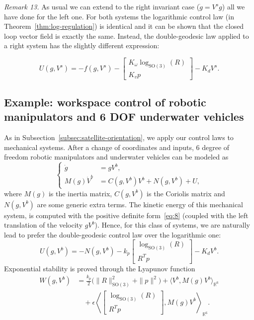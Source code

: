 \documentclass[10pt,twocolumn]{article}
\newcommand{\SO}{\mathrm{SO}}
\newcommand{\R}{\mathbb R}
\newcounter{paperitem}
\newcommand{\paperhead}[3]{\refstepcounter{paperitem}\par\medskip\noindent\textit{#1}\label{#3} #2\par}
\begin{document}
\paperhead{Remark 13.}{As usual we can extend to the right invariant case ($\dot g=V^s g$) all we have done for the left one. For both systems the logarithmic control law (in Theorem~\ref{thm:log-regulation}) is identical and it can be shown that the closed loop vector field is exactly the same. Instead, the double-geodesic law applied to a right system has the slightly different expression:}{rem:right-invariant}
\begin{equation*}
U(g,V^s)=-f(g,V^s)-
\begin{bmatrix}
K_\omega\log_{\SO(3)}(R)\\
K_vp
\end{bmatrix}-K_dV^s.
\end{equation*}

\subsection{Example: workspace control of robotic manipulators and 6 DOF underwater vehicles}\label{subsec:workspace-control}
As in Subsection~\ref{subsec:satellite-orientation}, we apply our control laws to mechanical systems. After a change of coordinates and inputs, 6 degree of freedom robotic manipulators and underwater vehicles can be modeled as
\begin{equation*}
\left\{\begin{aligned}
\dot g&=gV^b,\\
M(g)\dot V^b&=C(g,V^b)V^b+N(g,V^b)+U,
\end{aligned}\right.
\end{equation*}
where $M(g)$ is the inertia matrix, $C(g,V^b)$ is the Coriolis matrix and $N(g,V^b)$ are some generic extra terms. The kinetic energy of this mechanical system, is computed with the positive definite form~\eqref{eq:8} (coupled with the left translation of the velocity $gV^b$). Hence, for this class of systems, we are naturally lead to prefer the double-geodesic control law over the logarithmic one:
\begin{equation*}
U(g,V^b)=-N(g,V^b)-k_p
\begin{bmatrix}
\log_{\SO(3)}(R)\\
R^Tp
\end{bmatrix}-K_dV^b.
\end{equation*}
Exponential stability is proved through the Lyapunov function
\begin{align*}
W(g,V^b)&=\frac{k_p}{2}\bigl(\|R\|_{\SO(3)}^2+\|p\|^2\bigr)
+\langle V^b,M(g)V^b\rangle_{\R^6}\\
&\quad+\epsilon\left\langle
\begin{bmatrix}\log_{\SO(3)}(R)\\R^Tp\end{bmatrix},
M(g)V^b
\right\rangle_{\R^6}.
\end{align*}
\end{document}
